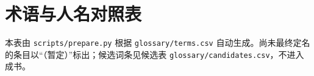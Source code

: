 \chapter*{术语与人名对照表}

本表由 \texttt{scripts/prepare.py} 根据 \texttt{glossary/terms.csv} 自动生成。尚未最终定名的条目以“（暂定）”标出；候选词条见候选表 \texttt{glossary/\allowbreak candidates.csv}，不进入成书。

\vspace{0.8em}

